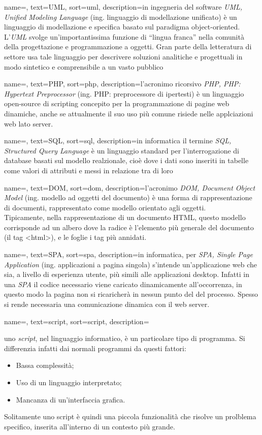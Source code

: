 {
    name=,
    text=UML,
    sort=uml,
    description={in ingegneria del software \emph{UML, Unified Modeling Language} (ing. linguaggio di modellazione unificato) è un linguaggio di modellazione e specifica basato sul paradigma object-oriented. L'\emph{UML} svolge un'importantissima funzione di ``lingua franca'' nella comunità della progettazione e programmazione a oggetti. Gran parte della letteratura di settore usa tale linguaggio per descrivere soluzioni analitiche e progettuali in modo sintetico e comprensibile a un vasto pubblico}
}

{
	name=,
	text=PHP,
	sort=php,
	description={l'acronimo ricorsivo \emph{PHP, PHP: Hypertext Preprocessor} (ing. PHP: preprocessore di ipertesti) è un linguaggio open-source di scripting concepito per la programmazione di pagine web dinamiche, anche se attualmente il suo uso più comune risiede nelle applciazioni web lato server.}
}

{
	name=,
	text=SQL,
	sort=sql,
	description={in informatica il termine \emph{SQL, Structured Query Language} è un linguaggio standard per l'interrogazione di database basati sul modello realzionale, cioè dove i dati sono inseriti in tabelle come valori di attributi e messi in relazione tra di loro }
}

{
	name=,
	text=DOM,
	sort=dom,
	description={l'acronimo \emph{DOM, Document Object Model} (ing.  modello ad oggetti del documento) è una forma di rappresentazione di documenti, rappresentato come modello orientato agli oggetti.\\
	Tipicamente, nella rappresentazione di un documento HTML, questo modello corrisponde ad un albero dove la radice è l'elemento più generale del documento (il tag <html>), e le foglie i tag più annidati.}
}

{
	name=,
	text=SPA,
	sort=spa,
	description={in informatica, per \emph{SPA, Single Page Application} (ing. applicazioni a pagina singola) s'intende un'applicazione web che sia, a livello di esperienza utente, più simili alle applicazioni desktop. Infatti in una \emph{SPA} il codice necessario viene caricato dinamicamente all'occorrenza, in questo modo la pagina non si ricaricherà in nessun punto del del processo. Spesso si rende necessaria una comunicazione dinamica con il web server.}
}


{
	name=,
	text=script,
	sort=script,
	description={uno \emph{script}, nel linguaggio informatico, è un particolare tipo di programma. Si differenzia infatti dai normali programmi da questi fattori:
	\begin{itemize}
		\item Bassa complessità;
		\item Uso di un linguaggio interpretato;
		\item Mancanza di un'interfaccia grafica.
	\end{itemize}
	Solitamente uno script è quindi una piccola funzionalità che risolve un prolblema specifico, inserita all'interno di un contesto più grande.}
}


